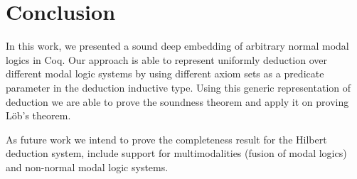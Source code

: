 \documentclass[sigconf,anonymous]{acmart}
\begin{document}

\section{Conclusion}\label{sec:conclusion}

In this work, we presented a sound deep embedding of arbitrary
normal modal logics in Coq. Our approach is able to represent uniformly
deduction over different modal logic systems by using different axiom sets
as a predicate parameter in the deduction inductive type. Using this generic
representation of deduction we are able to prove the soundness theorem and
apply it on proving L\"ob's theorem.

As future work we intend to prove the completeness result for the Hilbert
deduction system, include support for multimodalities (fusion of modal logics)
and non-normal modal logic systems.



\end{document}
